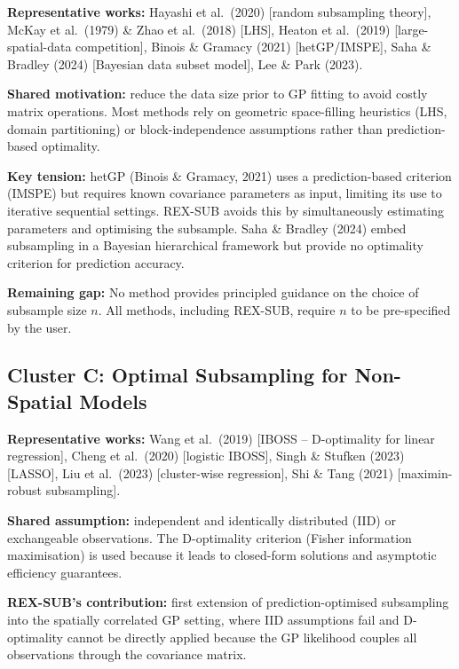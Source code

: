 \documentclass[12pt, a4paper]{article}
\begin{document}
\textbf{Representative works:} Hayashi et al.\ (2020) [random subsampling theory],
McKay et al.\ (1979) \& Zhao et al.\ (2018) [LHS], Heaton et al.\ (2019)
[large-spatial-data competition], Binois \& Gramacy (2021) [hetGP/IMSPE],
Saha \& Bradley (2024) [Bayesian data subset model], Lee \& Park (2023).

\textbf{Shared motivation:} reduce the data size prior to GP fitting to avoid
costly matrix operations.  Most methods rely on geometric space-filling heuristics
(LHS, domain partitioning) or block-independence assumptions rather than
prediction-based optimality.

\textbf{Key tension:} hetGP (Binois \& Gramacy, 2021) uses a prediction-based
criterion (IMSPE) but requires known covariance parameters as input, limiting its
use to iterative sequential settings.  REX-SUB avoids this by simultaneously
estimating parameters and optimising the subsample.  Saha \& Bradley (2024) embed
subsampling in a Bayesian hierarchical framework but provide no optimality criterion
for prediction accuracy.

\begin{warnbox}
  \textbf{Remaining gap:} No method provides principled guidance on the choice of
  subsample size $n$.  All methods, including REX-SUB, require $n$ to be
  pre-specified by the user.
\end{warnbox}

\subsection{Cluster C: Optimal Subsampling for Non-Spatial Models}

\textbf{Representative works:} Wang et al.\ (2019) [IBOSS -- D-optimality for
linear regression], Cheng et al.\ (2020) [logistic IBOSS], Singh \& Stufken (2023)
[LASSO], Liu et al.\ (2023) [cluster-wise regression], Shi \& Tang (2021)
[maximin-robust subsampling].

\textbf{Shared assumption:} independent and identically distributed (IID) or
exchangeable observations.  The D-optimality criterion (Fisher information
maximisation) is used because it leads to closed-form solutions and asymptotic
efficiency guarantees.

\textbf{REX-SUB's contribution:} first extension of prediction-optimised subsampling
into the spatially correlated GP setting, where IID assumptions fail and D-optimality
cannot be directly applied because the GP likelihood couples all observations through
the covariance matrix.
\end{document}
